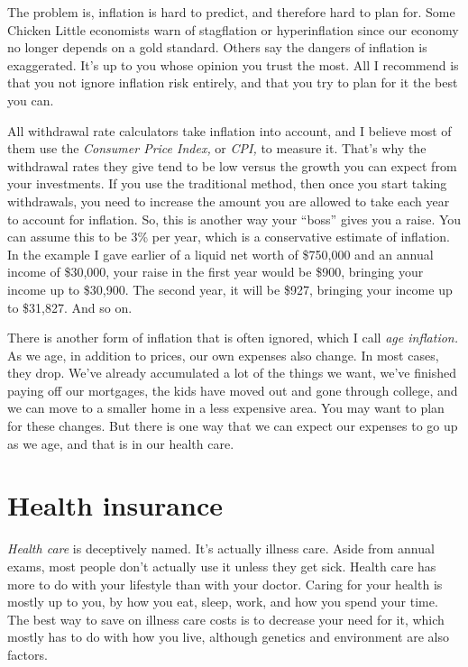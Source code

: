 The problem is, inflation is hard to predict, and therefore hard to plan for. Some Chicken Little economists warn of stagflation or hyperinflation since our economy no longer depends on a gold standard. Others say the dangers of inflation is exaggerated. It's up to you whose opinion you trust the most. All I recommend is that you not ignore inflation risk entirely, and that you try to plan for it the best you can.

All withdrawal rate calculators take inflation into account, and I believe most of them use the \emph{Consumer Price Index,} or \emph{CPI,} to measure it. That's why the withdrawal rates they give tend to be low versus the growth you can expect from your investments. If you use the traditional method, then once you start taking withdrawals, you need to increase the amount you are allowed to take each year to account for inflation. So, this is another way your ``boss'' gives you a raise. You can assume this to be 3\% per year, which is a conservative estimate of inflation. In the example I gave earlier of a liquid net worth of \$750,000 and an annual income of \$30,000, your raise in the first year would be \$900, bringing your income up to \$30,900. The second year, it will be \$927, bringing your income up to \$31,827. And so on.

There is another form of inflation that is often ignored, which I call \emph{age inflation.} As we age, in addition to prices, our own expenses also change. In most cases, they drop. We've already accumulated a lot of the things we want, we've finished paying off our mortgages, the kids have moved out and gone through college, and we can move to a smaller home in a less expensive area. You may want to plan for these changes. But there is one way that we can expect our expenses to go up as we age, and that is in our health care.

\section{Health insurance}
\emph{Health care} is deceptively named. It's actually illness care. Aside from annual exams, most people don't actually use it unless they get sick. Health care has more to do with your lifestyle than with your doctor. Caring for your health is mostly up to you, by how you eat, sleep, work, and how you spend your time. The best way to save on illness care costs is to decrease your need for it, which mostly has to do with how you live, although genetics and environment are also factors.

